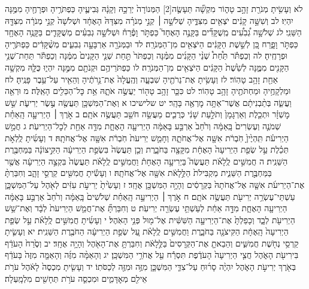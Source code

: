 \documentclass[twoside, openany, parskip=half, 11pt]{book}
\begin{document}
לא וְעָשִׂ֥יתָ מְנֹרַ֖ת זָהָ֣ב טָה֑וֹר מִקְשָׁ֞ה תֵּעָשֶׂ֤ה‏[2] הַמְּנוֹרָה֙ יְרֵכָ֣הּ וְקָנָ֔הּ גְּבִיעֶ֛יהָ כַּפְתֹּרֶ֥יהָ וּפְרָחֶ֖יהָ מִמֶּ֥נָּה יִהְיֽוּ׃ לב וְשִׁשָּׁ֣ה קָנִ֔ים יֹצְאִ֖ים מִצִּדֶּ֑יהָ שְׁלֹשָׁ֣ה ׀ קְנֵ֣י מְנֹרָ֗ה מִצִּדָּהּ֙ הָאֶחָ֔ד וּשְׁלֹשָׁה֙ קְנֵ֣י מְנֹרָ֔ה מִצִּדָּ֖הּ הַשֵּׁנִֽי׃ לג שְׁלֹשָׁ֣ה גְ֠בִעִ֠ים מְֽשֻׁקָּדִ֞ים בַּקָּנֶ֣ה הָאֶחָד֮ כַּפְתֹּ֣ר וָפֶ֒רַח֒ וּשְׁלֹשָׁ֣ה גְבִעִ֗ים מְשֻׁקָּדִ֛ים בַּקָּנֶ֥ה הָאֶחָ֖ד כַּפְתֹּ֣ר וָפָ֑רַח כֵּ֚ן לְשֵׁ֣שֶׁת הַקָּנִ֔ים הַיֹּצְאִ֖ים מִן־הַמְּנֹרָֽה׃ לד וּבַמְּנֹרָ֖ה אַרְבָּעָ֣ה גְבִעִ֑ים מְשֻׁ֨קָּדִ֔ים כַּפְתֹּרֶ֖יהָ וּפְרָחֶֽיהָ׃ לה וְכַפְתֹּ֡ר תַּ֩חַת֩ שְׁנֵ֨י הַקָּנִ֜ים מִמֶּ֗נָּה וְכַפְתֹּר֙ תַּ֣חַת שְׁנֵ֤י הַקָּנִים֙ מִמֶּ֔נָּה וְכַפְתֹּ֕ר תַּחַת־שְׁנֵ֥י הַקָּנִ֖ים מִמֶּ֑נָּה לְשֵׁ֙שֶׁת֙ הַקָּנִ֔ים הַיֹּצְאִ֖ים מִן־הַמְּנֹרָֽה׃ לו כַּפְתֹּרֵיהֶ֥ם וּקְנֹתָ֖ם מִמֶּ֣נָּה יִהְי֑וּ כֻּלָּ֛הּ מִקְשָׁ֥ה אַחַ֖ת זָהָ֥ב טָהֽוֹר׃ לז וְעָשִׂ֥יתָ אֶת־נֵרֹתֶ֖יהָ שִׁבְעָ֑ה וְהֶֽעֱלָה֙ אֶת־נֵ֣רֹתֶ֔יהָ וְהֵאִ֖יר עַל־עֵ֥בֶר פָּנֶֽיהָ׃ לח וּמַלְקָחֶ֥יהָ וּמַחְתֹּתֶ֖יהָ זָהָ֥ב טָהֽוֹר׃ לט כִּכָּ֛ר זָהָ֥ב טָה֖וֹר יַעֲשֶׂ֣ה אֹתָ֑הּ אֵ֥ת כׇּל־הַכֵּלִ֖ים הָאֵֽלֶּה׃ מ וּרְאֵ֖ה וַעֲשֵׂ֑ה בְּתַ֨בְנִיתָ֔ם אֲשֶׁר־אַתָּ֥ה מׇרְאֶ֖ה בָּהָֽר׃
יט שלישיכו א וְאֶת־הַמִּשְׁכָּ֥ן תַּעֲשֶׂ֖ה עֶ֣שֶׂר יְרִיעֹ֑ת שֵׁ֣שׁ מׇשְׁזָ֗ר וּתְכֵ֤לֶת וְאַרְגָּמָן֙ וְתֹלַ֣עַת שָׁנִ֔י כְּרֻבִ֛ים מַעֲשֵׂ֥ה חֹשֵׁ֖ב תַּעֲשֶׂ֥ה אֹתָֽם׃ ב אֹ֣רֶךְ ׀ הַיְרִיעָ֣ה הָֽאַחַ֗ת שְׁמֹנֶ֤ה וְעֶשְׂרִים֙ בָּֽאַמָּ֔ה וְרֹ֙חַב֙ אַרְבַּ֣ע בָּאַמָּ֔ה הַיְרִיעָ֖ה הָאֶחָ֑ת מִדָּ֥ה אַחַ֖ת לְכׇל־הַיְרִיעֹֽת׃ ג חֲמֵ֣שׁ הַיְרִיעֹ֗ת תִּֽהְיֶ֙יןָ֙ חֹֽבְרֹ֔ת אִשָּׁ֖ה אֶל־אֲחֹתָ֑הּ וְחָמֵ֤שׁ יְרִיעֹת֙ חֹֽבְרֹ֔ת אִשָּׁ֖ה אֶל־אֲחֹתָֽהּ׃ ד וְעָשִׂ֜יתָ לֻֽלְאֹ֣ת תְּכֵ֗לֶת עַ֣ל שְׂפַ֤ת הַיְרִיעָה֙ הָאֶחָ֔ת מִקָּצָ֖ה בַּחֹבָ֑רֶת וְכֵ֤ן תַּעֲשֶׂה֙ בִּשְׂפַ֣ת הַיְרִיעָ֔ה הַקִּ֣יצוֹנָ֔ה בַּמַּחְבֶּ֖רֶת הַשֵּׁנִֽית׃ ה חֲמִשִּׁ֣ים לֻֽלָאֹ֗ת תַּעֲשֶׂה֮ בַּיְרִיעָ֣ה הָאֶחָת֒ וַחֲמִשִּׁ֣ים לֻֽלָאֹ֗ת תַּעֲשֶׂה֙ בִּקְצֵ֣ה הַיְרִיעָ֔ה אֲשֶׁ֖ר בַּמַּחְבֶּ֣רֶת הַשֵּׁנִ֑ית מַקְבִּילֹת֙ הַלֻּ֣לָאֹ֔ת אִשָּׁ֖ה אֶל־אֲחֹתָֽהּ׃ ו וְעָשִׂ֕יתָ חֲמִשִּׁ֖ים קַרְסֵ֣י זָהָ֑ב וְחִבַּרְתָּ֨ אֶת־הַיְרִיעֹ֜ת אִשָּׁ֤ה אֶל־אֲחֹתָהּ֙ בַּקְּרָסִ֔ים וְהָיָ֥ה הַמִּשְׁכָּ֖ן אֶחָֽד׃ ז וְעָשִׂ֙יתָ֙ יְרִיעֹ֣ת עִזִּ֔ים לְאֹ֖הֶל עַל־הַמִּשְׁכָּ֑ן עַשְׁתֵּי־עֶשְׂרֵ֥ה יְרִיעֹ֖ת תַּעֲשֶׂ֥ה אֹתָֽם׃ ח אֹ֣רֶךְ ׀ הַיְרִיעָ֣ה הָֽאַחַ֗ת שְׁלֹשִׁים֙ בָּֽאַמָּ֔ה וְרֹ֙חַב֙ אַרְבַּ֣ע בָּאַמָּ֔ה הַיְרִיעָ֖ה הָאֶחָ֑ת מִדָּ֣ה אַחַ֔ת לְעַשְׁתֵּ֥י עֶשְׂרֵ֖ה יְרִיעֹֽת׃ ט וְחִבַּרְתָּ֞ אֶת־חֲמֵ֤שׁ הַיְרִיעֹת֙ לְבָ֔ד וְאֶת־שֵׁ֥שׁ הַיְרִיעֹ֖ת לְבָ֑ד וְכָפַלְתָּ֙ אֶת־הַיְרִיעָ֣ה הַשִּׁשִּׁ֔ית אֶל־מ֖וּל פְּנֵ֥י הָאֹֽהֶל׃ י וְעָשִׂ֜יתָ חֲמִשִּׁ֣ים לֻֽלָאֹ֗ת עַ֣ל שְׂפַ֤ת הַיְרִיעָה֙ הָֽאֶחָ֔ת הַקִּיצֹנָ֖ה בַּחֹבָ֑רֶת וַחֲמִשִּׁ֣ים לֻֽלָאֹ֗ת עַ֚ל שְׂפַ֣ת הַיְרִיעָ֔ה הַחֹבֶ֖רֶת הַשֵּׁנִֽית׃ יא וְעָשִׂ֛יתָ קַרְסֵ֥י נְחֹ֖שֶׁת חֲמִשִּׁ֑ים וְהֵבֵאתָ֤ אֶת־הַקְּרָסִים֙ בַּלֻּ֣לָאֹ֔ת וְחִבַּרְתָּ֥ אֶת־הָאֹ֖הֶל וְהָיָ֥ה אֶחָֽד׃ יב וְסֶ֙רַח֙ הָעֹדֵ֔ף בִּירִיעֹ֖ת הָאֹ֑הֶל חֲצִ֤י הַיְרִיעָה֙ הָעֹדֶ֔פֶת תִּסְרַ֕ח עַ֖ל אֲחֹרֵ֥י הַמִּשְׁכָּֽן׃ יג וְהָאַמָּ֨ה מִזֶּ֜ה וְהָאַמָּ֤ה מִזֶּה֙ בָּעֹדֵ֔ף בְּאֹ֖רֶךְ יְרִיעֹ֣ת הָאֹ֑הֶל יִהְיֶ֨ה סָר֜וּחַ עַל־צִדֵּ֧י הַמִּשְׁכָּ֛ן מִזֶּ֥ה וּמִזֶּ֖ה לְכַסֹּתֽוֹ׃ יד וְעָשִׂ֤יתָ מִכְסֶה֙ לָאֹ֔הֶל עֹרֹ֥ת אֵילִ֖ם מְאׇדָּמִ֑ים וּמִכְסֵ֛ה עֹרֹ֥ת תְּחָשִׁ֖ים מִלְמָֽעְלָה׃
\end{document}
